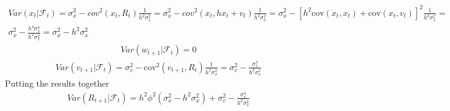 \begin{gather*}
    Var( x_t| \mathcal{F}_t) = \sigma_x^2 - cov^2(x_t, R_t) \frac{1}{h^2 \sigma_x^2}= \sigma_x^2  - cov^2(x_t, hx_t+v_t) \frac{1}{h^2 \sigma_x^2}= \sigma_x^2  - [h^2 \text{cov}(x_t,x_t)+\text{cov}(x_t,v_t)]^2\frac{1}{h^2\sigma_x^2} =  \\ 
    \sigma_x^2 - \frac{h^4 \sigma_x^4}{h^2 \sigma_x^2}=\sigma_x^2 -h^2\sigma_x^2
\end{gather*}
\begin{gather*}
    Var( w_{t+1}| \mathcal{F}_t)=0
\end{gather*}
\begin{gather*}
    Var( v_{t+1}| \mathcal{F}_t)=\sigma_v^2-\text{cov}^2(v_{t+1},R_t)\frac{1}{h^2\sigma_x^2} = \sigma_v^2 - \frac{\sigma_v^4}{h^2 \sigma_x^2} 
\end{gather*}
Putting the results together
\begin{gather*}
    Var(R_{t+1}|\mathcal{F}_t) = h^2 \phi^2 (\sigma_x^2-h^2\sigma_x^2)+\sigma_v^2-\frac{\sigma_v^4}{h^2 \sigma_x^2}
\end{gather*}